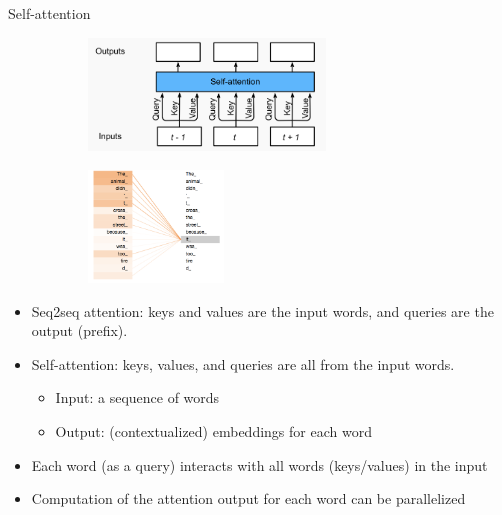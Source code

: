 \documentclass[usenames,dvipsnames,11pt,aspectratio=169]{beamer}
\begin{document}
\begin{frame}
    {Self-attention}
    \begin{figure}
        \begin{subfigure}{.5\textwidth}
        \includegraphics[height=3cm]{figures/self-attn}
        \end{subfigure}
        \begin{subfigure}{.4\textwidth}
        \includegraphics[height=3cm]{figures/self-attn-ex}
        \end{subfigure}
    \end{figure}
    \begin{itemize}
        \item Seq2seq attention: keys and values are the input words, and queries are the output (prefix).
        \item Self-attention: keys, values, and queries are all from the input words.
            \begin{itemize}
                \item Input: a sequence of words
                \item Output: (contextualized) embeddings for each word
            \end{itemize}
        \item Each word (as a query) interacts with all words (keys/values) in the input
        \item Computation of the attention output for each word can be parallelized
    \end{itemize}
\end{frame}
\end{document}
